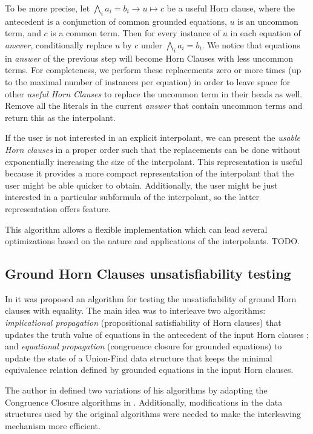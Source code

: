 \documentclass[sigconf,authordraft]{acmart}
\begin{document}
\begin{itemize}
  To be more precise, let $\bigwedge_i a_i = b_i \rightarrow u \mapsto c$ be a useful Horn clause,
  where the antecedent is a conjunction of common grounded equations, $u$ is an uncommon term,
  and $c$ is a common term.
  Then for every instance of $u$ in each equation of \emph{answer}, conditionally replace $u$
  by $c$ under $\bigwedge_i a_i = b_i$.
  We notice that equations in \emph{answer}  of the previous step will become Horn Clauses with
  less uncommon terms. For completeness, we perform these replacements zero or more times
  (up to the maximal number of instances per equation) in order to leave space for other
  \emph{useful Horn Clauses} to replace the uncommon term in their heads as well.
  Remove all the literals in the current \emph{answer} that contain uncommon terms and return this
  as the interpolant.
\end{itemize}

If the user is not interested in an explicit interpolant, we can present the \emph{usable Horn
  clauses} in a proper order such that the replacements can be done without exponentially increasing
the size of the interpolant. This representation is useful because it provides a more compact
representation of the interpolant that the user might be able quicker to obtain.
Additionally, the user might be just interested in a particular subformula of the interpolant, so the
latter representation offers feature.

This algorithm allows a flexible implementation which can lead several optimizations
based on the nature and applications of the interpolants. TODO.

\subsection{Ground Horn Clauses unsatisfiability testing}

In \cite{GALLIER1987233} it was proposed an algorithm for testing the unsatisfiability
of ground Horn clauses with equality. The main idea was to interleave two algorithms: \emph{implicational propagation}
(propositional satisfiability of Horn clauses) that updates the truth value of equations
in the antecedent of the input Horn clauses \cite{DOWLING1984267}; and \emph{equational propagation} (congruence closure
for grounded equations) to update the state of a Union-Find data structure \cite{10.1145/364099.364331}
that keeps the minimal equivalence relation defined by grounded equations in the input Horn clauses.

The author in \cite{GALLIER1987233} defined two variations of his algorithms by adapting
the Congruence Closure algorithms in \cite{10.1145/322217.322228, 10.1145/322186.322198}.
Additionally, modifications in the data structures used by the original algorithms were needed
to make the interleaving mechanism more efficient.
\end{document}
